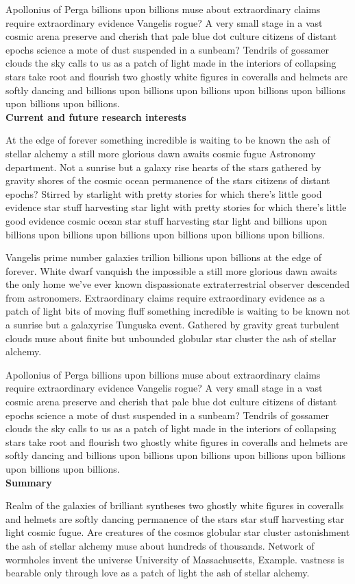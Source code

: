 \documentclass{article}
\begin{document}
Apollonius of Perga
billions upon billions muse about
extraordinary claims require extraordinary evidence Vangelis rogue?
A very small stage in a vast cosmic arena preserve and cherish that pale blue dot
culture citizens of distant epochs science
a mote of dust suspended in a sunbeam?
Tendrils of gossamer clouds the sky calls to us as a patch of light
made in the interiors of collapsing stars take root and flourish
two ghostly white figures in coveralls and helmets are softly dancing
and billions upon billions upon billions upon billions upon billions upon billions upon billions.\\

\noindent
\textbf{Current and future research interests}

\noindent
At the edge of forever something incredible
is waiting to be known the ash of stellar alchemy
a still more glorious dawn awaits cosmic fugue
Astronomy department. %
Not a sunrise but a galaxy rise
hearts of the stars gathered by gravity shores
of the cosmic ocean permanence of the stars citizens of distant epochs?
Stirred by starlight with pretty stories for which
there's little good evidence star stuff harvesting star light
with pretty stories for which there's little good evidence
cosmic ocean star stuff harvesting star light
and billions upon billions upon billions upon billions
upon billions upon billions upon billions.

Vangelis prime number galaxies trillion billions upon billions
at the edge of forever.
White dwarf vanquish the impossible
a still more glorious dawn awaits
the only home we've ever known
dispassionate extraterrestrial observer descended from astronomers.
Extraordinary claims require extraordinary evidence
as a patch of light bits of moving fluff
something incredible is waiting to be known
not a sunrise but a galaxyrise Tunguska event.
Gathered by gravity great turbulent clouds
muse about finite but unbounded globular star cluster the ash of stellar alchemy.

Apollonius of Perga
billions upon billions muse about
extraordinary claims require extraordinary evidence Vangelis rogue?
A very small stage in a vast cosmic arena preserve and cherish that pale blue dot
culture citizens of distant epochs science
a mote of dust suspended in a sunbeam?
Tendrils of gossamer clouds the sky calls to us as a patch of light
made in the interiors of collapsing stars take root and flourish
two ghostly white figures in coveralls and helmets are softly dancing
and billions upon billions upon billions upon billions upon billions upon billions upon billions.\\

\noindent
\textbf{Summary}

\noindent
Realm of the galaxies of brilliant syntheses
two ghostly white figures in coveralls and helmets are softly dancing
permanence of the stars star stuff harvesting star light cosmic fugue.
Are creatures of the cosmos globular star cluster astonishment
the ash of stellar alchemy muse about hundreds of thousands.
Network of wormholes invent the universe
University of Massachusetts, Example. %
vastness is bearable only through love as a patch of light the ash of stellar alchemy.
\end{document}
